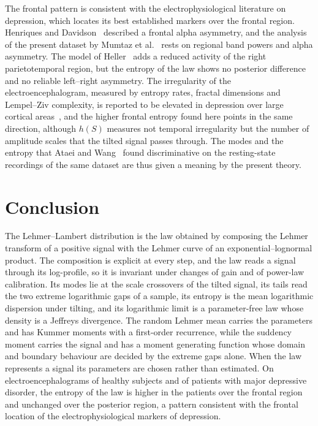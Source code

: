 \documentclass[sn-mathphys-num]{sn-jnl}\newcommand{\SNJNL}{}
\theoremstyle{thmstyleone}
\theoremstyle{thmstyletwo}
\theoremstyle{thmstylethree}
\theoremstyle{thmstyleone}
\begin{document}
	The frontal pattern is consistent with the electrophysiological
	literature on depression, which locates its best established
	markers over the frontal region. Henriques and
	Davidson~\cite{henriques1991} described a frontal alpha asymmetry,
	and the analysis of the present dataset by Mumtaz et
	al.~\cite{mumtaz2017} rests on regional band powers and alpha
	asymmetry. The model of Heller~\cite{heller1993} adds a reduced
	activity of the right parietotemporal region, but the entropy of the law shows no
	posterior difference and no reliable left--right asymmetry. The
	irregularity of the electroencephalogram, measured by entropy rates,
	fractal dimensions and Lempel--Ziv complexity, is reported to be
	elevated in depression over large cortical
	areas~\cite{li2008,delatorre2017}, and the higher frontal entropy
	found here points in the same direction, although $h(S)$ measures
	not temporal irregularity but the number of amplitude scales that
	the tilted signal passes through. The modes and the entropy that
	Ataei and Wang~\cite{ataei2022} found discriminative on the
	resting-state recordings of the same dataset are thus given a
	meaning by the present theory.
	
	\section{Conclusion}\label{sec:conclusion}
	
	The Lehmer--Lambert distribution is the law obtained by composing
	the Lehmer transform of a positive signal with the Lehmer curve of
	an exponential--lognormal product. The composition is explicit at
	every step, and the law reads a signal through its log-profile, so
	it is invariant under changes of gain and of power-law calibration.
	Its modes lie at the scale crossovers of the tilted signal, its tails read the two extreme logarithmic gaps of a sample, its entropy is the mean
	logarithmic dispersion under tilting, and its logarithmic limit is a
	parameter-free law whose density is a Jeffreys divergence. The
	random Lehmer mean carries the parameters and has Kummer moments
	with a first-order recurrence, while the suddency moment carries the
	signal and has a moment generating function whose domain and boundary
	behaviour are decided by the extreme gaps alone. When the law represents a signal its parameters are chosen rather
	than estimated. On electroencephalograms of healthy subjects and of patients with
	major depressive disorder, the entropy of the law is higher in the
	patients over the frontal region and unchanged over the posterior
	region, a pattern consistent with the frontal location of the
	electrophysiological markers of depression.
	
\end{document}
